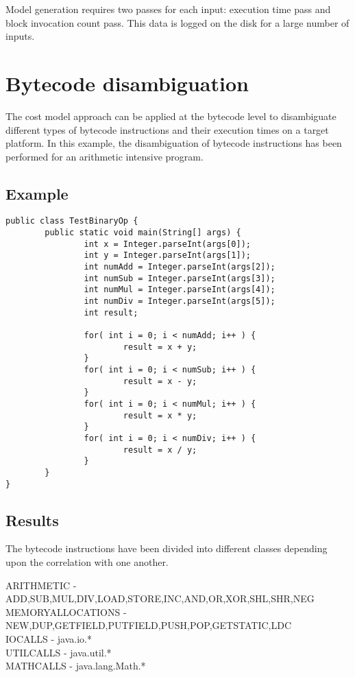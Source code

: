 Model generation requires two passes for each input: execution time pass and block invocation count pass. This data is logged on the disk for a large number of inputs.\newline 

\section{Bytecode disambiguation}
The cost model approach can be applied at the bytecode level to disambiguate different types of bytecode instructions and their execution times on a target platform. In this example, the disambiguation of bytecode instructions has been performed for an arithmetic intensive program.
\subsection{Example}
\singlespacing
\begin{lstlisting}
public class TestBinaryOp {
        public static void main(String[] args) {
                int x = Integer.parseInt(args[0]);
                int y = Integer.parseInt(args[1]);
                int numAdd = Integer.parseInt(args[2]);
                int numSub = Integer.parseInt(args[3]);
                int numMul = Integer.parseInt(args[4]);
                int numDiv = Integer.parseInt(args[5]);
                int result;
              
                for( int i = 0; i < numAdd; i++ ) {
                        result = x + y;
                }
                for( int i = 0; i < numSub; i++ ) {
                        result = x - y;
                }
                for( int i = 0; i < numMul; i++ ) {
                        result = x * y;
                }
                for( int i = 0; i < numDiv; i++ ) {
                        result = x / y;
                }
        }
}
\end{lstlisting}
\doublespacing

\subsection{Results}
The bytecode instructions have been divided into different classes depending upon the correlation with one another.

ARITHMETIC         - ADD,SUB,MUL,DIV,LOAD,STORE,INC,AND,OR,XOR,SHL,SHR,NEG\\
MEMORYALLOCATIONS  - NEW,DUP,GETFIELD,PUTFIELD,PUSH,POP,GETSTATIC,LDC\\
IOCALLS            - java.io.*\\
UTILCALLS          - java.util.*\\
MATHCALLS          - java.lang.Math.*\\

